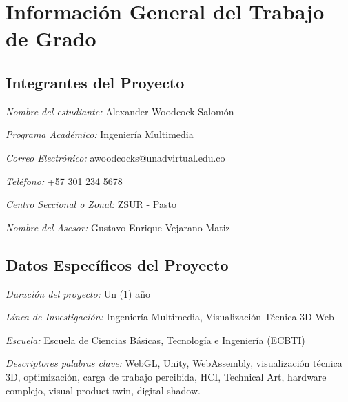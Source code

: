 \documentclass[12pt,letterpaper]{article}
\begin{document}
\section{Información General del Trabajo de Grado}

\subsection{Integrantes del Proyecto}

\textit{Nombre del estudiante:} Alexander Woodcock Salomón

\textit{Programa Académico:} Ingeniería Multimedia

\textit{Correo Electrónico:} awoodcocks@unadvirtual.edu.co

\textit{Teléfono:} +57 301 234 5678

\textit{Centro Seccional o Zonal:} ZSUR - Pasto

\textit{Nombre del Asesor:} Gustavo Enrique Vejarano Matiz

\subsection{Datos Específicos del Proyecto}

\textit{Duración del proyecto:} Un (1) año

\textit{Línea de Investigación:} Ingeniería Multimedia, Visualización Técnica 3D Web

\textit{Escuela:} Escuela de Ciencias Básicas, Tecnología e Ingeniería (ECBTI)

\textit{Descriptores palabras clave:} WebGL, Unity, WebAssembly, visualización técnica 3D, optimización, carga de trabajo percibida, HCI, Technical Art, hardware complejo, visual product twin, digital shadow.









\end{document}
